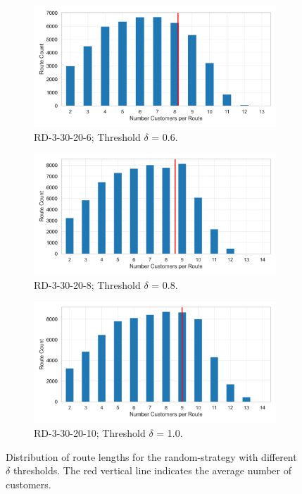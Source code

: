 \begin{figure}[ht]
	\centering
	\begin{subfigure}[t]{.5\textwidth}
		\centering
		\includegraphics[width=\linewidth]{pictures/dataset_structure/no_cust_plot_RandomData_3_30_20_6.png}
		\caption{RD-3-30-20-6; Threshold $\delta$ = 0.6.}
		\label{fig:ds-a}
	\end{subfigure}%
	\begin{subfigure}[t]{.5\textwidth}
		\centering
		\includegraphics[width=\linewidth]{pictures/dataset_structure/no_cust_plot_RandomData_3_30_20_8.png}
		\caption{RD-3-30-20-8; Threshold $\delta$ = 0.8.}
		\label{fig:ds-b}
	\end{subfigure}
	\begin{subfigure}{.5\textwidth}
		\centering
		\includegraphics[width=\linewidth]{pictures/dataset_structure/no_cust_plot_RandomData_3_30_20_10.png}
		\caption{RD-3-30-20-10; Threshold $\delta$ = 1.0.}
		\label{fig:ds-c}
	\end{subfigure}
	\caption[Distribution of route lengths for the random-strategy with different $\delta$ thresholds.]
	{Distribution of route lengths for the random-strategy with different $\delta$ thresholds. The red vertical line indicates the average number of customers.}
	\label{fig:route-dists_randomdata}
\end{figure}
\clearpage

